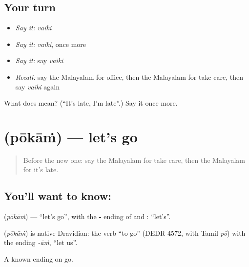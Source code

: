 \subsection*{Your turn}
\begin{itemize}
\raggedright
  \item \emph{Say it:} \emph{vaiki}
  \item \emph{Say it:} \emph{vaiki}, once more
  \item \emph{Say it:} say \emph{vaiki}
  \item \emph{Recall:} say the Malayalam for office, then the Malayalam for take care, then say \emph{vaiki} again
\end{itemize}

\begin{tcolorbox}[breakable,colback=teal!4,colframe=teal!35!black,title={Before you move on}]
What does  mean? (\textquotedblleft{}It's late, I'm late\textquotedblright{}.) Say it once more.
\end{tcolorbox}
\section[\texorpdfstring{\ml{പോകാം} (pōkāṁ)}{പോകാം (pōkāṁ)}]{ (pōkāṁ) — let's go}

\label{lesson:ML-C127-letsgo}



\begin{quote}
Before the new one: say the Malayalam for take care, then the Malayalam for it's late.
\end{quote}

\subsection*{You'll want to know: }
\textbf{} (\emph{pōkāṁ}) — \textquotedblleft{}let's go\textquotedblright{}, with the \textbf{‑} ending of \textbf{ } and \textbf{}: \textquotedblleft{}let's\textquotedblright{}.

\begin{cousinweb}
\textbf{} (\emph{pōkāṁ}) is native Dravidian: the verb \textquotedblleft{}to go\textquotedblright{} (DEDR 4572, with Tamil \emph{pō}) with the ending \emph{-āṁ}, \textquotedblleft{}let us\textquotedblright{}.
\end{cousinweb}

\begin{grammarlens}[title={What you've built}]
A known ending on go.
\end{grammarlens}

